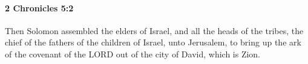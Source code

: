 
		\paragraph{2 Chronicles 5:2} %
			\label{2CHRONICLES-5-2}

			Then Solomon assembled the elders of Israel, and all the heads of the tribes, the chief of the fathers of the children of Israel, unto Jerusalem, to bring up the ark of the covenant of the LORD out of the city of David, which is Zion.


